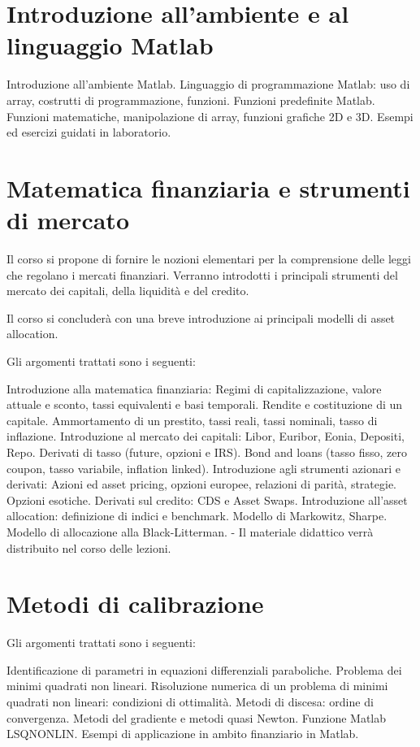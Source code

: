\documentclass[a4paper,10pt]{article}
\begin{document}
\section{Introduzione all'ambiente e al linguaggio Matlab}
Introduzione all'ambiente Matlab.
Linguaggio di programmazione Matlab: uso di array, costrutti di programmazione, funzioni.
Funzioni predefinite Matlab. Funzioni matematiche, manipolazione di array, funzioni grafiche 2D e 3D.
Esempi ed esercizi guidati in laboratorio.


\section{Matematica finanziaria e strumenti di mercato}
Il corso si propone di fornire le nozioni elementari per la comprensione delle leggi che regolano i mercati finanziari. Verranno introdotti i principali strumenti del mercato dei capitali, della liquidità e del credito.

Il corso si concluderà con una breve introduzione ai principali modelli di asset allocation.

Gli argomenti trattati sono i seguenti:

Introduzione alla matematica finanziaria: Regimi di capitalizzazione, valore attuale e sconto, tassi equivalenti e basi temporali. Rendite e costituzione di un capitale. Ammortamento di un prestito, tassi reali, tassi nominali, tasso di inflazione.
Introduzione al mercato dei capitali: Libor, Euribor, Eonia, Depositi, Repo. Derivati di tasso (future, opzioni e IRS). Bond and loans (tasso fisso, zero coupon, tasso variabile, inflation linked).
Introduzione agli strumenti azionari e derivati: Azioni ed asset pricing, opzioni europee, relazioni di parità, strategie. Opzioni esotiche. Derivati sul credito: CDS e Asset Swaps.
Introduzione all'asset allocation: definizione di indici e benchmark. Modello di Markowitz, Sharpe. Modello di allocazione alla Black-Litterman.
- Il materiale didattico verrà distribuito nel corso delle lezioni.


\section{Metodi di calibrazione}
Gli argomenti trattati sono i seguenti:

Identificazione di parametri in equazioni differenziali paraboliche. Problema dei minimi quadrati non lineari.
Risoluzione numerica di un problema di minimi quadrati non lineari: condizioni di ottimalità. Metodi di discesa: ordine di convergenza.
Metodi del gradiente e metodi quasi Newton.
Funzione Matlab LSQNONLIN.
Esempi di applicazione in ambito finanziario in Matlab.
\end{document}
